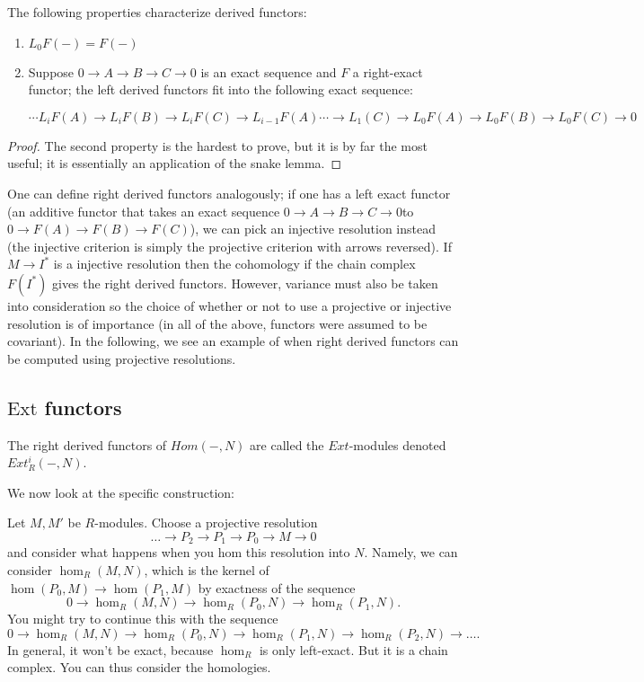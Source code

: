 \begin{theorem} The following properties characterize derived
functors: \begin{enumerate}
\item{ $L_0F(-)=F(-)$ }
\item{ Suppose $0\rightarrow A\rightarrow B\rightarrow
C\rightarrow 0$ is an exact sequence and $F$ a right-exact
functor; the left derived functors fit into the following exact
sequence:

\begin{equation} \cdots L_iF(A)\rightarrow L_iF(B)\rightarrow
L_iF(C)\rightarrow L_{i-1}F(A)\cdots\rightarrow
L_1(C)\rightarrow L_0F(A)\rightarrow L_0F(B)\rightarrow
L_0F(C)\rightarrow 0 \end{equation}}
\end{enumerate}
\end{theorem}
\begin{proof} The second property is the hardest to prove, but
it is by far the most useful; it is essentially an application
of the snake lemma. \end{proof}
One can define right derived functors analogously; if one has a
left exact functor (an additive functor that takes an exact
sequence $0\rightarrow A\rightarrow B\rightarrow C\rightarrow 0$to
$0\rightarrow F(A)\rightarrow F(B)\rightarrow F(C)$), we can
pick an injective resolution instead (the injective criterion is simply the
projective criterion with arrows reversed). If
$M\rightarrow I^*$ is a injective resolution then the cohomology if the chain
complex $F(I^*)$ gives the right derived functors.
However, variance must also be taken into consideration so the
choice of whether or not to use a projective or injective
resolution is of importance (in all of the above, functors were
assumed to be covariant). In the following, we see an example of when right
derived functors can be computed using projective
resolutions.

\newcommand{\ext}{\mathrm{Ext}}
\subsection{$\ext$ functors}

\begin{definition} The right derived functors of $Hom(-,N)$ are
called the $Ext$-modules denoted $Ext^i_R(-,N)$.
\end{definition}
We now look at the specific construction:

Let $M, M'$ be $R$-modules. Choose a projective resolution
\[ \dots \to P_2 \to P_1 \to P_0 \to M \to 0  \]
and consider what happens when you hom this resolution into $N$.
Namely, we can
consider $\hom_R(M,N)$, which is the kernel of $\hom(P_0, M)
\to\hom(P_1, M) $
by exactness of the sequence
\[ 0 \to \hom_R(M,N) \to \hom_R(P_0, N) \to \hom_R(P_1, N) . \]
You might try to continue this with the sequence
\[ 0 \to \hom_R(M,N) \to \hom_R(P_0, N) \to \hom_R(P_1, N) \to
\hom_R(P_2, N)
\to \dots. \]
In general, it won't be exact, because $\hom_R$ is only
left-exact. But it is a
chain complex. You can thus consider the homologies.


